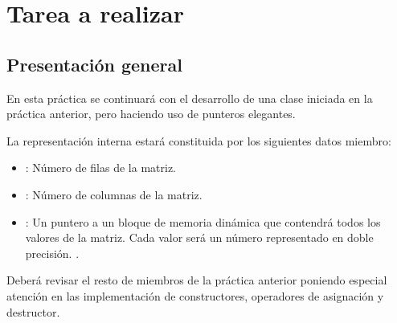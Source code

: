 \section{Tarea a realizar}

\subsection{Presentación general}

En esta práctica se continuará con el desarrollo de una clase 
iniciada en la práctica anterior, pero haciendo uso de punteros elegantes.

La representación interna estará constituida por los siguientes datos miembro:

\begin{itemize}
\item {}: Número de filas de la matriz.
\item {}: Número de columnas de la matriz.
\item {}: Un puntero a un bloque de memoria dinámica que contendrá
todos los valores de la matriz. Cada valor será un número representado en doble
precisión. .
\end{itemize}

Deberá revisar el resto de miembros de la práctica anterior poniendo especial 
atención en las implementación de constructores, operadores de asignación y
destructor.

